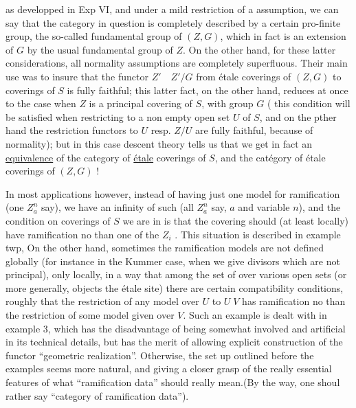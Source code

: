as developped in Exp VI, and under a mild restriction  of a  assumption, we can say that the category in question is  completely described by a certain pro-finite group, the so-called fundamental group of $(Z,G)$, which in fact is an extension of $G$ by the usual fundamental group of $Z$. On the other hand, for these latter considerations, all normality assumptions are completely superfluous. Their main use was to insure that the functor $Z'\quad Z'/G$ from étale coverings of $(Z,G)$ to coverings of $S$ is fully faithful; this latter fact, on the other hand, reduces at once to the case when $Z$ is a principal covering of $S$, with group $G$ ( this condition will be satisfied when restricting to a non empty open set $U$ of $S$, and on the pther hand the restriction functors  to $U$ resp. $Z/U$ are fully faithful, because of normality); but in this case descent theory tells us that we get in fact an \uline{equivalence} of the category of \uline{étale} coverings of $S$, and the catégory of étale coverings of $(Z,G)$ !

In most applications however, instead of having just one model for ramification (one $Z_a^n$ say), we have an infinity of such (all $Z_a^n$ say,  $a$ and variable $n$), and the condition on coverings  of $S$ we are  in is that the covering should (at least locally) have ramification no  than one of the $Z_i$ . This situation is described in example twp, On the other hand, sometimes the ramification models are not defined globally (for instance in the Kummer case, when we give  divisors which are not principal), only locally, in a way that among the set of   over various open sets (or more generally, objects  the étale site) there are certain compatibility conditions, roughly that the restriction of any model over $U$ to $U\;V$ has ramification no  than the restriction of some model given over $V$. Such an example is
dealt with in example 3, which has the disadvantage of being somewhat involved and artificial in its technical details, but has the merit of allowing explicit construction of the functor ``geometric realization''. Otherwise, the set up outlined before the examples seems more natural, and giving a closer grasp of the  really essential features of what ``ramification data'' should really mean.(By the way, one shoul rather say ``category of ramification data'').

